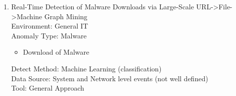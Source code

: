 \begin{enumerate}
    \item
    Real-Time Detection of Malware Downloads via Large-Scale URL->File->Machine Graph Mining\cite{rahbarinia2016real}\\
    Environment: General IT\\
    Anomaly Type: Malware
    \begin{itemize}
        \item Download of Malware
    \end{itemize}
    Detect Method: Machine Learning (classification) \\
    Data Source: System and Network level events (not well defined) \\
    Tool: General Approach
\end{enumerate}